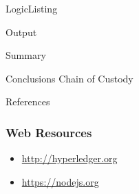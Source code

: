 \documentclass[pdf,table]{beamer}
\begin{document}
\begin{frame}{Logic}{Listing}
	
\end{frame}

\begin{frame}{Output}
	
\end{frame}

\begin{frame}{Summary}
	\begin{block}{Conclusions}
		Chain of Custody		
	\end{block}
\end{frame}

\begin{frame}[allowframebreaks]{References}
	\nocite{jahankhani:2019c}
	\printbibliography
\end{frame}
	
\begin{frame}
	\frametitle{Web Resources}
	\begin{itemize}
	\item \url{http://hyperledger.org}
	\item \url{https://nodejs.org}
	\end{itemize}
\end{frame}
\end{document}
